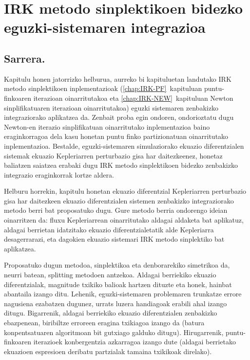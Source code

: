 \chapter{IRK metodo sinplektikoen bidezko eguzki-sistemaren integrazioa}


\section{Sarrera.}
  


Kapitulu honen jatorrizko helburua, aurreko  bi kapituluetan landutako IRK metodo sinplektikoen inplementazioak (\ref{chap:IRK-PF}~kapituluan puntu-finkoaren iterazioan oinarritutakoa eta \ref{chap:IRK-NEW}~kapituluan Newton sinplifikatuaren iterazioan oinarritutakoa) eguzki sistemaren zenbakizko integraziorako aplikatzea da.  Zenbait proba egin ondoren, ondorioztatu dugu Newton-en iterazio sinplifikatuan oinarritutako inplementazioa baino eraginkorragoa dela kasu  honetan puntu finko partizionatuan oinarritutako inplementazioa. Bestalde, eguzki-sistemaren simulaziorako ekuazio diferentzialen sistemak ekuazio Kepleriarren perturbazio gisa har daitezkeenez, honetaz baliatzen saiatzea erabaki dugu IRK metodo sinplektikoen bidezko zenbakizko integrazio eraginkorrak lortze aldera.

Helburu horrekin,  kapitulu honetan ekuazio diferentzial Kepleriarren perturbazio gisa har daitezkeen ekuazio diferentzialen sistemen zenbakizko integraziorako metodo berri bat proposatuko dugu. Gure metodo berria ondorengo ideian  oinarritzen da: fluxu Kepleriarrean oinarritutako aldagai aldaketa bat aplikatuz, aldagai berrietan idatzitako ekuazio diferentzialetatik alde Kepleriarra desagerrarazi, eta dagokien ekuazio sistemari IRK metodo sinplektiko bat aplikatzea.


Proposatuko dugun metodoa, sinplektikoa eta denborarekiko simetrikoa da, neurri batean, splitting metodoen antzekoa. Aldagai berriekiko ekuazio diferentzialak, magnitude txikiko balioak hartzen dituzte eta honek, hainbat abantaila izango ditu. Lehenik, eguzki-sistemaren problemaren trunkatze errore nagusiena ezabatzen dugunez, urrats luzera handiagoak erabili ahal izango ditugu. Bigarrenik, aldagai berriekiko ekuazio diferentzialen zenbakizko ebazpenean, biribiltze erroreen eragina txikiagoa izango da (batura konpentsatuaren algoritmoan bit gutxiago galduko ditugu). Hirugarrenik, puntu-finkoaren iterazioek konbergentzia azkarragoa izango dute (aldagai berrietako ekuazioen espresioen deribatu partzialak tamaina txikikoak direlako).

